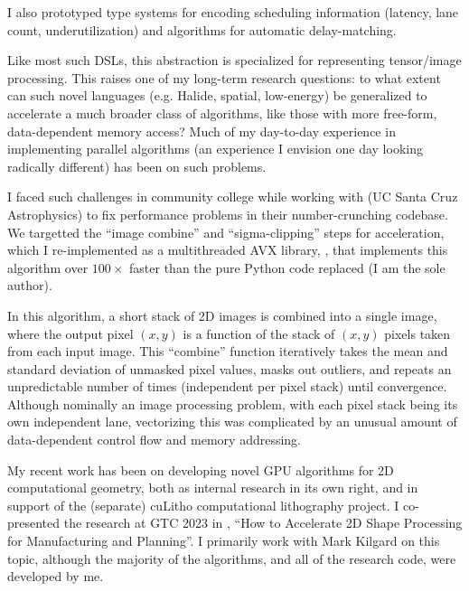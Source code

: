 I also prototyped type systems for encoding scheduling information (latency, lane count, underutilization) and algorithms for automatic delay-matching.

Like most such DSLs, this abstraction is specialized for representing tensor/image processing. This raises one of my long-term research questions: to what extent can such novel languages (e.g. Halide, spatial, low-energy) be generalized to accelerate a much broader class of algorithms, like those with more free-form, data-dependent memory access? Much of my day-to-day experience in implementing parallel algorithms (an experience I envision one day looking radically different) has been on such problems.

I faced such challenges in community college while working with  (UC Santa Cruz Astrophysics) to fix performance problems in their number-crunching codebase. We targetted the ``image combine'' and ``sigma-clipping'' steps for acceleration, which I re-implemented as a multithreaded AVX library, , that implements this algorithm over $100\times$ faster than the pure Python code replaced (I am the sole author).

In this algorithm, a short stack of 2D images is combined into a
single image, where the output pixel $(x,y)$ is a function of the
stack of $(x,y)$ pixels taken from each input image. This ``combine''
function iteratively takes the mean and standard deviation of
unmasked pixel values, masks out outliers, and repeats an
unpredictable number of times (independent per pixel stack) until
convergence. Although nominally an image processing problem, with each
pixel stack being its own independent lane, vectorizing this was
complicated by an unusual amount of data-dependent control flow and
memory addressing.

\filbreak

My recent work has been on developing novel GPU algorithms for 2D
computational geometry, both as internal research in its own right,
and in support of the (separate) cuLitho computational lithography
project. I co-presented the research at GTC 2023
in , ``How to Accelerate 2D Shape Processing for Manufacturing and
Planning''. I primarily work with Mark Kilgard on this topic, although
the majority of the algorithms, and all of the research code, were
developed by me.

